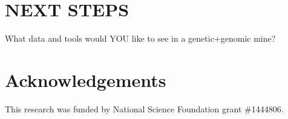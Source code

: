 \documentclass[]{pagposter}
\begin{document}
\begin{multicols*}{3}

  \section*{NEXT STEPS}

  What data and tools would YOU like to see in a genetic+genomic mine?





  \nocite{*} %


  \section*{Acknowledgements}
  
  \noindent This research was funded by National Science Foundation grant \#1444806.
  
\end{multicols*}
\end{document}
